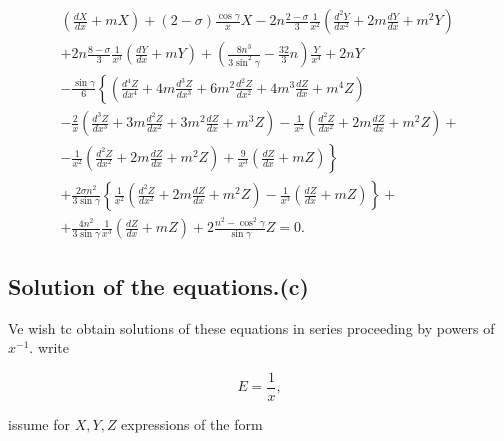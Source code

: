 \[
\begin{array}{c}
\left(\frac{d X}{d x}+m X\right)+(2-\sigma) \frac{\cos \gamma}{x} X-2 n \frac{2-\sigma}{3} \frac{1}{x^2}
\left(\frac{d^2 Y}{d x^2}+2 m \frac{d Y}{d x}+m^2 Y\right) \\
+ 2n \frac{8-\sigma}{3} \frac{1}{x^3} \left(\frac{d Y}{d x}+m Y\right)+
\left( \frac{8 n^3}{3 \sin ^2 \gamma} -\frac{32}{3} n\right) \frac{Y}{x^4}+2 n Y \\
-\frac{\sin \gamma}{6}
\left\{\left(
\frac{d^4 Z}{d x^4}+4 m \frac{d^3 Z}{d x^3}+
6 m^2 \frac{d^2 Z}{d x^2}+4 m^3 \frac{d Z}{d x}+m^4 Z
\right)\right. \\
-\frac{2}{x}\left(\frac{d^3 Z}{d x^3}+3 m \frac{d^2 Z}{d x^2}+3 m^2 \frac{d Z}{d x}+m^3 Z\right)
-\frac{1}{x^2}\left( \frac{d^2 Z}{d x^2} +2 m \frac{d Z}{d x}+m^2 Z\right)+\\
\left.  -\frac{1}{x^2}\left( \frac{d^2 Z}{d x^2} +2 m \frac{d Z}{d x}+m^2 Z\right)+
 \frac{9}{x^3}\left(\frac{d Z}{d x}+m Z\right)\right\} \\
+\frac{2 \sigma n^2}{3 \sin \gamma}
\left\{\frac{1}{x^2}\left(\frac{d^2 Z}{d x^2}+2 m \frac{d Z}{d x}+m^2 Z\right)
-\frac{1}{x^3}\left(\frac{d Z}{d x}+m Z\right)\right\}+\\
+\frac{4 n^2}{3 \sin \gamma} \frac{1}{x^3}\left(\frac{d Z}{d x}+m Z\right) +
2 \frac{n^2-\cos^2 \gamma}{\sin \gamma} Z=0 .
\end{array}\]

\subsection{Solution of the equations.(c)}

Ve wish tc obtain solutions of these equations in series proceeding by
powers of \(x^{-1}\). write

\[E=\frac{1}{x},\]

issume for \(X, Y, Z\) expressions of the form

